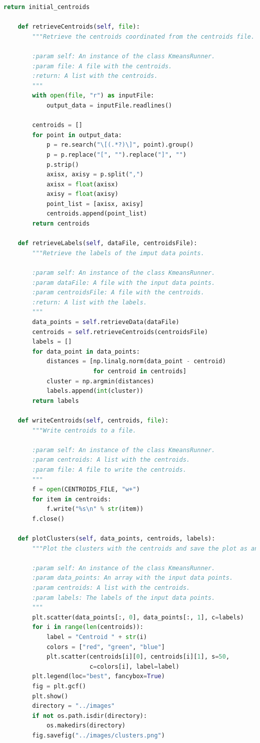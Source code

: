 \documentclass[11pt]{article}
\begin{document}
\begin{lstlisting}[language=Python]
        return initial_centroids

    def retrieveCentroids(self, file):
        """Retrieve the centroids coordinated from the centroids file.

        :param self: An instance of the class KmeansRunner.
        :param file: A file with the centroids.
        :return: A list with the centroids.
        """
        with open(file, "r") as inputFile:
            output_data = inputFile.readlines()

        centroids = []
        for point in output_data:
            p = re.search("\[(.*?)\]", point).group()
            p = p.replace("[", "").replace("]", "")
            p.strip()
            axisx, axisy = p.split(",")
            axisx = float(axisx)
            axisy = float(axisy)
            point_list = [axisx, axisy]
            centroids.append(point_list)
        return centroids

    def retrieveLabels(self, dataFile, centroidsFile):
        """Retrieve the labels of the imput data points.

        :param self: An instance of the class KmeansRunner.
        :param dataFile: A file with the input data points.
        :param centroidsFile: A file with the centroids.
        :return: A list with the labels.
        """
        data_points = self.retrieveData(dataFile)
        centroids = self.retrieveCentroids(centroidsFile)
        labels = []
        for data_point in data_points:
            distances = [np.linalg.norm(data_point - centroid)
                         for centroid in centroids]
            cluster = np.argmin(distances)
            labels.append(int(cluster))
        return labels

    def writeCentroids(self, centroids, file):
        """Write centroids to a file.

        :param self: An instance of the class KmeansRunner.
        :param centroids: A list with the centroids.
        :param file: A file to write the centroids.
        """
        f = open(CENTROIDS_FILE, "w+")
        for item in centroids:
            f.write("%s\n" % str(item))
        f.close()

    def plotClusters(self, data_points, centroids, labels):
        """Plot the clusters with the centroids and save the plot as an image.

        :param self: An instance of the class KmeansRunner.
        :param data_points: An array with the input data points.
        :param centroids: A list with the centroids.
        :param labels: The labels of the input data points.
        """
        plt.scatter(data_points[:, 0], data_points[:, 1], c=labels)
        for i in range(len(centroids)):
            label = "Centroid " + str(i)
            colors = ["red", "green", "blue"]
            plt.scatter(centroids[i][0], centroids[i][1], s=50,
                        c=colors[i], label=label)
        plt.legend(loc="best", fancybox=True)
        fig = plt.gcf()
        plt.show()
        directory = "../images"
        if not os.path.isdir(directory):
            os.makedirs(directory)
        fig.savefig("../images/clusters.png")



\end{lstlisting}
\end{document}
